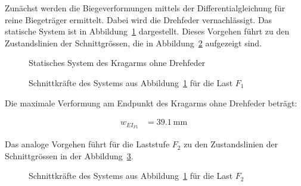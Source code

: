 \documentclass[
  11pt,
  letterpaper,
]{scrreprt}
\begin{document}
Zunächst werden die Biegeverformungen mittels der Differentialgleichung
für reine Biegeträger ermittelt. Dabei wird die Drehfeder
vernachlässigt. Das statische System ist in
Abbildung~\ref{fig-kragarm-sys} dargestellt. Dieses Vorgehen führt zu
den Zustandslinien der Schnittgrössen, die in
Abbildung~\ref{fig-skkragarmreal} aufgezeigt sind.

\begin{figure}[H]


\caption{\label{fig-kragarm-sys}Statisches System des Kragarms ohne
Drehfeder}

\end{figure}%

\begin{figure}[H]


\caption{\label{fig-skkragarmreal}Schnittkräfte des Systems aus
Abbildung~\ref{fig-kragarm-sys} für die Last \(F_1\)}

\end{figure}%

Die maximale Verformung am Endpunkt des Kragarms ohne Drehfeder beträgt:

$$
\begin{aligned}
w_{EI_{F1}} &= 39.1\ \mathrm{mm} \;
\end{aligned}
$$

Das analoge Vorgehen führt für die Laststufe \(F_2\) zu den
Zustandslinien der Schnittgrössen in der
Abbildung~\ref{fig-skkragarmreal_high}.

\begin{figure}[H]


\caption{\label{fig-skkragarmreal_high}Schnittkräfte des Systems aus
Abbildung~\ref{fig-kragarm-sys} für die Last \(F_2\)}

\end{figure}%
\end{document}
